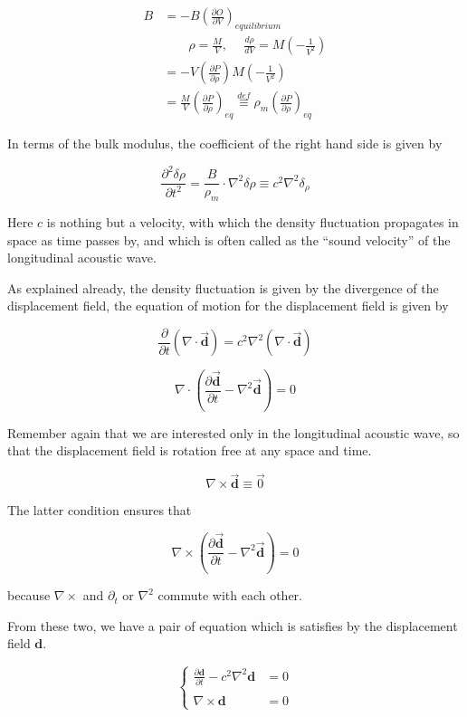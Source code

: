 \[\begin{split}
B &= -B\left(\frac{\partial O}{\partial V}\right)_{equilibrium}\\
&\quad\quad \rho = \frac{M}{V},\ \quad \frac{d\rho}{dV} = M\left(-\frac{1}{V^2}\right)\\
&= -V\left(\frac{\partial P}{\partial\rho}\right)M\left(-\frac{1}{V^2}\right)\\ &= \frac{M}{V}\left(\frac{\partial P}{\partial \rho}\right)_{eq} \overset{def}{\equiv}\rho_m\left(\frac{\partial P}{\partial\rho}\right)_{eq}
\end{split} \]

In terms of the bulk modulus, the coefficient of the right hand side is given by 

\[\frac{\partial^2\delta\rho}{\partial t^2} = \frac{B}{\rho_m}\cdot\nabla^2\delta\rho \equiv c^2\nabla^2\delta_\rho \]

Here $c$ is nothing but a velocity, with which the density fluctuation propagates in space as time passes by, and which is often called as the ``sound velocity'' of the longitudinal acoustic wave. 

As explained already, the density fluctuation is given by the divergence of the displacement field, the equation of motion for the displacement field is given by 

\[\frac{\partial}{\partial t}(\nabla\cdot\vec{\bm{d}}) = c^2\nabla^2(\nabla\cdot\vec{\bm{d}}) \]

\[\nabla\cdot\left(\frac{\partial \vec{\bm{d}}}{\partial t} - \nabla^2\vec{\bm{d}}\right) = 0 \]

Remember again that we are interested only in the longitudinal acoustic wave, so that the displacement field is rotation free at any space and time. 

\[\nabla\times\vec{\bm{d}} \equiv\vec{0} \]

The latter condition ensures that

\[\nabla\times\left(\frac{\partial \vec{\bm{d}}}{\partial t} - \nabla^2\vec{\bm{d}}\right) = 0\]

because $\nabla\times$ and $\partial_t$ or $\nabla^2$ commute with each other. 

From these two, we have a pair of equation which is satisfies by the displacement field $\bm{d}$. 

\[\begin{cases}
\frac{\partial\bm{d}}{\partial t} - c^2\nabla^2\bm{d} &= 0\\
\ &\ \\
\nabla\times\bm{d} &= 0
\end{cases}\]

